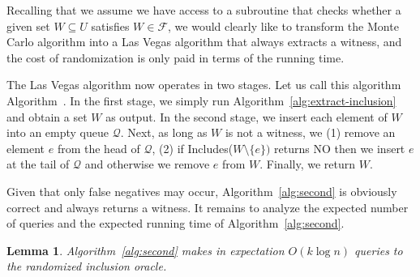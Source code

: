 \documentclass[11pt]{article}
\newtheorem{lemma}[theorem]{Lemma}
\begin{document}
Recalling that we assume we have access to a subroutine that checks whether a given set $W\subseteq U$ satisfies $W\in\mathcal{F}$, we would clearly like to transform the Monte Carlo algorithm into a Las Vegas algorithm that always extracts a witness, and the cost of randomization is only paid in terms of the running time. 

\makeatletter
The Las Vegas algorithm now operates in two stages. Let us call this algorithm Algorithm~\arabic{\algocf@float}\label{alg:second}. In the first stage, we simply run Algorithm~\ref{alg:extract-inclusion} and obtain a set $W$ as output. In the second stage, we insert each element of $W$ into an empty queue $\mathcal{Q}$. Next, as long as $W$ is not a witness, we (1) remove an element $e$ from the head of $\mathcal{Q}$, (2) if {\sc Includes}($W\setminus\{e\})$ returns NO then we insert $e$ at the tail of $\mathcal{Q}$ and otherwise we remove $e$ from $W$. Finally, we return $W$. 
\makeatother

Given that only false negatives may occur, Algorithm~\ref{alg:second} is obviously correct and always returns a witness. It remains to analyze the expected number of queries and the expected running time of Algorithm~\ref{alg:second}.

\begin{lemma}
\label{thm:1se-upper-bound-query-model}
Algorithm~\ref{alg:second} makes in expectation $O(k\log n)$ queries to the randomized inclusion oracle.
\end{lemma}
\end{document}

